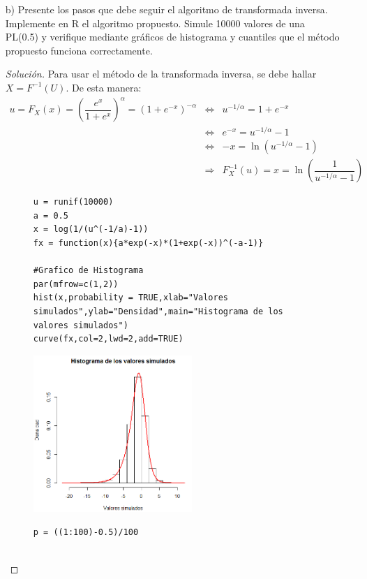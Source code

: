 \documentclass[11pt]{article}
\renewcommand{\=}[1]{\stackrel{#1}{=}} %
\newenvironment{sol}
{\begin{proof}[Solución]}
	{\end{proof}}
\theoremstyle{definition}
\theoremstyle{remark}
\begin{document}
\begin{itemize}
\begin{sol}
\begin{eqnarray}
		\end{eqnarray}
	\end{sol}
\item[b)] 	Presente los pasos que debe seguir el algoritmo de transformada inversa. Implemente en R el algoritmo propuesto. Simule 10000 valores de una PL(0.5) y verifique mediante gráficos de histograma y cuantiles que el método propuesto funciona correctamente.
\begin{sol}
	Para usar el método de la transformada inversa, se debe hallar $X=F^{-1}(U)$. De esta manera:
	\begin{eqnarray}
	u = F_X(x)=\left(\dfrac{e^x}{1+e^x}\right)^{\alpha}=(1+e^{-x})^{-\alpha}&\Leftrightarrow& u^{-1/\alpha}=1+e^{-x}\nonumber\\
	&\Leftrightarrow& e^{-x}=u^{-1/\alpha}-1\nonumber\\
	&\Leftrightarrow& -x=\ln\left(u^{-1/\alpha}-1\right)\nonumber\\
	&\Rightarrow& F_X^{-1}(u)=x=\ln\left(\dfrac{1}{u^{-1/\alpha}-1}\right)
	\end{eqnarray}
	\begin{figure}[h]
		\hspace*{0.9cm}\begin{minipage}{10cm}
			{
				\begin{lstlisting}[style=myRstyle, caption={Verificación mediante histograma / PL.}]
u = runif(10000)
a = 0.5
x = log(1/(u^(-1/a)-1))
fx = function(x){a*exp(-x)*(1+exp(-x))^(-a-1)}

#Grafico de Histograma
par(mfrow=c(1,2))
hist(x,probability = TRUE,xlab="Valores simulados",ylab="Densidad",main="Histograma de los valores simulados")
curve(fx,col=2,lwd=2,add=TRUE)
				\end{lstlisting}
			}			
		\end{minipage}
		\begin{minipage}{6cm}
			\includegraphics[width=6cm]{hist3}
		\end{minipage}
	\end{figure}
\begin{figure}[h]
	\hspace*{0.9cm}\begin{minipage}{10cm}
		{
			\begin{lstlisting}[style=myRstyle, caption={Verificación mediante gráfica de cuantiles / PL.}]
p = ((1:100)-0.5)/100


\end{lstlisting}}
\end{minipage}
\end{figure}
\end{sol}
\end{itemize}
\end{document}
